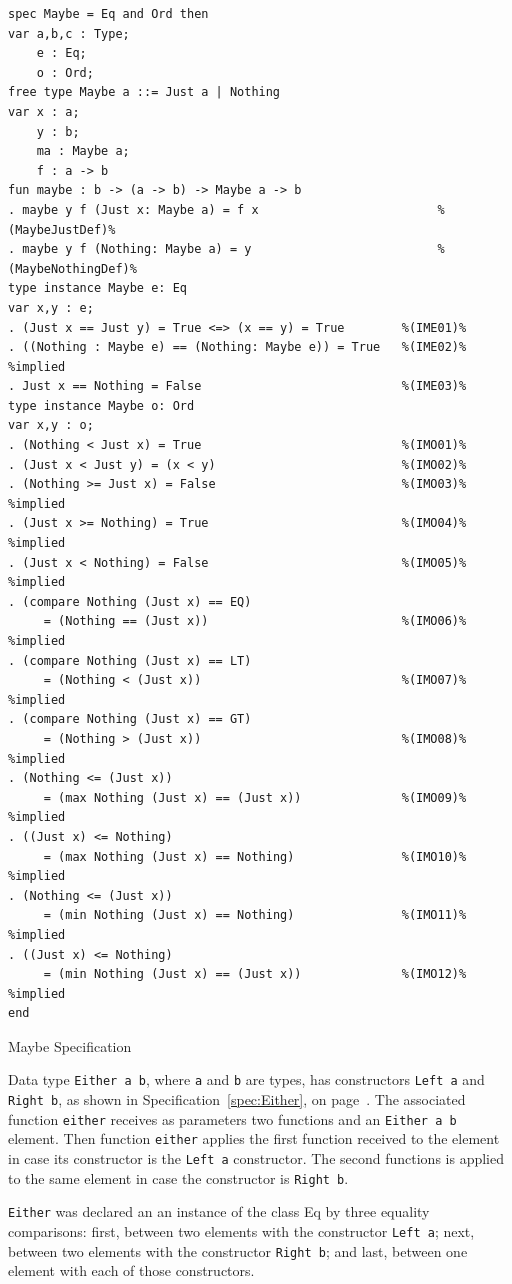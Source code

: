 \documentclass[12pt,twoside]{article}
\numberwithin{spec}{subsection}
\numberwithin{proof}{subsection}
\numberwithin{figure}{subsection}
\numberwithin{code}{subsection}
\newcommand{\citeSpec}[1]{Specification~\ref{#1}, on page~\pageref{#1}}
\begin{document}
\begin{spec}\capstart
\begin{verbatim}
spec Maybe = Eq and Ord then
var a,b,c : Type;
    e : Eq;
    o : Ord;
free type Maybe a ::= Just a | Nothing
var x : a;
    y : b;
    ma : Maybe a;
    f : a -> b
fun maybe : b -> (a -> b) -> Maybe a -> b
. maybe y f (Just x: Maybe a) = f x                         %(MaybeJustDef)%
. maybe y f (Nothing: Maybe a) = y                          %(MaybeNothingDef)%
type instance Maybe e: Eq
var x,y : e; 
. (Just x == Just y) = True <=> (x == y) = True        %(IME01)%
. ((Nothing : Maybe e) == (Nothing: Maybe e)) = True   %(IME02)% %implied
. Just x == Nothing = False                            %(IME03)%
type instance Maybe o: Ord
var x,y : o;
. (Nothing < Just x) = True                            %(IMO01)%
. (Just x < Just y) = (x < y)                          %(IMO02)%
. (Nothing >= Just x) = False                          %(IMO03)% %implied
. (Just x >= Nothing) = True                           %(IMO04)% %implied
. (Just x < Nothing) = False                           %(IMO05)% %implied
. (compare Nothing (Just x) == EQ)
     = (Nothing == (Just x))                           %(IMO06)% %implied
. (compare Nothing (Just x) == LT)
     = (Nothing < (Just x))                            %(IMO07)% %implied
. (compare Nothing (Just x) == GT)
     = (Nothing > (Just x))                            %(IMO08)% %implied
. (Nothing <= (Just x))
     = (max Nothing (Just x) == (Just x))              %(IMO09)% %implied
. ((Just x) <= Nothing)
     = (max Nothing (Just x) == Nothing)               %(IMO10)% %implied
. (Nothing <= (Just x))
     = (min Nothing (Just x) == Nothing)               %(IMO11)% %implied
. ((Just x) <= Nothing)
     = (min Nothing (Just x) == (Just x))              %(IMO12)% %implied
end
\end{verbatim}
\caption{Maybe Specification}
\label{spec:Maybe}
\end{spec}

Data type \verb.Either a b., where \verb.a. and \verb.b. are types, has constructors \verb.Left a. and \verb.Right b., as shown in \citeSpec{spec:Either}. The associated function \verb.either. receives as parameters two functions and an \verb.Either a b. element. Then function \verb.either. applies the first function received to the element in case its constructor is the \verb.Left a. constructor. The second functions is applied to the same element in case the constructor is \verb.Right b..

\verb.Either. was declared an an instance of the class Eq by three equality comparisons: first, between two elements with the constructor \verb.Left a.; next, between two elements with the constructor \verb.Right b.; and last, between one element with each of those constructors.
\end{document}
